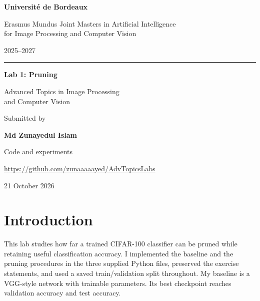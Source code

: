\documentclass[11pt,a4paper]{article}
\newcommand{\studentname}{Md Zunayedul Islam}
\newcommand{\githublink}{https://github.com/zunaaaaayed/AdvTopicsLabs}
\begin{document}
\begin{titlepage}
\centering
{}
\vspace*{0.8cm}
{\fontsize{18}{23}\selectfont\bfseries Universit\'e de Bordeaux\par}
\vspace{0.65cm}
{\fontsize{12}{17}\selectfont
Erasmus Mundus Joint Masters in Artificial Intelligence\\
for Image Processing and Computer Vision\par}
\vspace{0.3cm}
{\large 2025--2027\par}

\vspace{2.7cm}
{\color{coveraccent}\rule{0.22\linewidth}{0.8pt}\par}
\vspace{0.65cm}
{\color{coveraccent}\fontsize{34}{41}\selectfont\bfseries Lab 1: Pruning\par}
\vspace{0.55cm}
{\fontsize{15}{21}\selectfont
Advanced Topics in Image Processing\\
and Computer Vision\par}

\vfill
{\small Submitted by\par}
\vspace{0.15cm}
{\fontsize{15}{20}\selectfont\bfseries \studentname\par}
\vspace{0.75cm}
{\small Code and experiments\par}
\vspace{0.12cm}
{\small\expandafter\url\expandafter{\githublink}\par}
\vspace{0.6cm}
{\normalsize 21 October 2026\par}
\vspace*{1cm}
\end{titlepage}
\begingroup
\small
\setlength{\parskip}{0pt}
\tableofcontents
\endgroup
\newpage
{}

\section{Introduction}

This lab studies how far a trained CIFAR-100 classifier can be pruned while retaining useful classification accuracy. I implemented the baseline and the pruning procedures in the three supplied Python files, preserved the exercise statements, and used a saved train/validation split throughout. My baseline is a VGG-style network with \NParameters{} trainable parameters. Its best checkpoint reaches \BaselineVal{} validation accuracy and \BaselineTest{} test accuracy.
\end{document}
